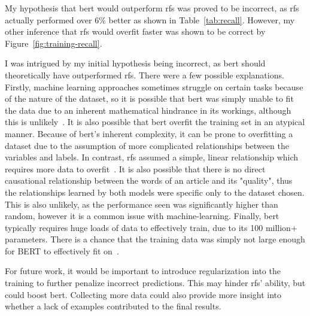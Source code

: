 My hypothesis that \acrshort{bert} would outperform \acrshort{rfs} was proved to be incorrect, as \acrshort{rfs} actually performed over $6\%$ better as shown in Table~\ref{tab:recall}. However, my other inference that \acrlong{rfs} would overfit faster was shown to be correct by Figure~\ref{fig:training-recall}.

I was intrigued by my initial hypothesis being incorrect, as \acrshort{bert} should theoretically have outperformed \acrshort{rfs}. There were a few possible explanations. Firstly, machine learning approaches sometimes struggle on certain tasks because of the nature of the dataset, so it is possible that \acrshort{bert} was simply unable to fit the data due to an inherent mathematical hindrance in its workings, although this is unlikely~\parencite{domingos2012few}. It is also possible that \acrshort{bert} overfit the training set in an atypical manner. Because of \acrshort{bert}'s inherent complexity, it can be prone to overfitting a dataset due to the assumption of more complicated relationships between the variables and labels. In contrast, \acrlong{rfs} assumed a simple, linear relationship which requires more data to overfit~\parencite{domingos2012few}. It is also possible that there is no direct causational relationship between the words of an article and its "quality", thus the relationships learned by both models were specific only to the dataset chosen. This is also unlikely, as the performance seen was significantly higher than random, however it is a common issue with machine-learning. Finally, \acrshort{bert} typically requires huge loads of data to effectively train, due to its 100 million+ parameters. There is a chance that the training data was simply not large enough for BERT to effectively fit on~\parencite{gonzlezcarvajal2020comparing}.

For future work, it would be important to introduce regularization into the training to further penalize incorrect predictions. This may hinder \acrshort{rfs}' ability, but could boost \acrshort{bert}. Collecting more data could also provide more insight into whether a lack of examples contributed to the final results.